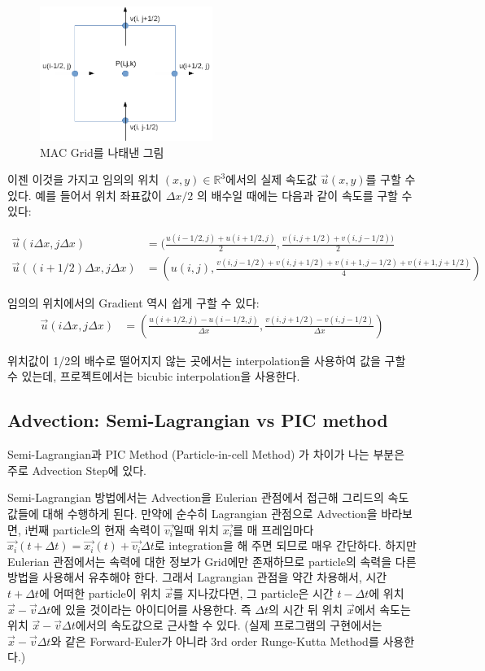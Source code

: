 \documentclass[12pt, A4]{article}
\begin{document}
\begin{figure}[h]
\centering
\includegraphics[width=0.5\textwidth]{mac_grid}
\caption{MAC Grid를 나태낸 그림}
\end{figure}

이젠 이것을 가지고 임의의 위치 $(x, y) \in \mathbb{R}^3$에서의 실제 속도값 $\vec{u}(x, y)$를 구할 수 있다. 예를 들어서 위치 좌표값이 $\Delta x / 2$ 의 배수일 때에는 다음과 같이 속도를 구할 수 있다:

\begin{align*} 
  \vec{u}(i \Delta x, j \Delta x) &= (\frac{u(i-1/2, j) + u(i+1/2, j)}{2}, \frac{v(i,j+1/2) + v(i,j-1/2))}{2} \\
  \vec{u}((i+1/2) \Delta x, j \Delta x) &= (u(i,j), \frac{v(i,j-1/2) + v(i,j+1/2) + v(i+1,j-1/2) + v(i+1,j+1/2)}{4})
\end{align*}

임의의 위치에서의 Gradient 역시 쉽게 구할 수 있다:
\begin{align*}
  \vec{u}(i \Delta x, j \Delta x) &= (\frac{u(i+1/2, j) - u(i-1/2, j)}{\Delta x}, \frac{v(i,j+1/2) - v(i,j-1/2)}{\Delta x})
\end{align*}

위치값이 1/2의 배수로 떨어지지 않는 곳에서는 interpolation을 사용하여 값을 구할 수 있는데, 프로젝트에서는 bicubic interpolation을 사용한다.

\subsection{Advection: Semi-Lagrangian vs PIC method}

Semi-Lagrangian과 PIC Method (Particle-in-cell Method) 가 차이가 나는 부분은 주로 Advection Step에 있다. 

Semi-Lagrangian 방법에서는 Advection을 Eulerian 관점에서 접근해 그리드의 속도 값들에 대해 수행하게 된다. 만약에 순수히 Lagrangian 관점으로 Advection을 바라보면, i번째 particle의 현재 속력이 $\vec{v_i}$일때 위치 $\vec{x_i}$를 매 프레임마다 $\vec{x_i}(t + \Delta t) = \vec{x_i}(t) + \vec{v_i} \Delta t$로 integration을 해 주면 되므로 매우 간단하다. 하지만 Eulerian 관점에서는 속력에 대한 정보가 Grid에만 존재하므로 particle의 속력을 다른 방법을 사용해서 유추해야 한다. 그래서 Lagrangian 관점을 약간 차용해서, 시간 $t + \Delta t$에 어떠한 particle이 위치 $\vec{x}$를 지나갔다면, 그 particle은 시간 $t - \Delta t$에 위치 $\vec{x} - \vec{v} \Delta t$에 있을 것이라는 아이디어를 사용한다. 즉 $\Delta t$의 시간 뒤 위치 $\vec{x}$에서 속도는 위치 $\vec{x} - \vec{v} \Delta t$에서의 속도값으로 근사할 수 있다. (실제 프로그램의 구현에서는 $\vec{x} - \vec{v} \Delta t$와 같은 Forward-Euler가 아니라 3rd order Runge-Kutta Method를 사용한다.) \cite[p.29-33]{fluid-sim-cg}
\end{document}
